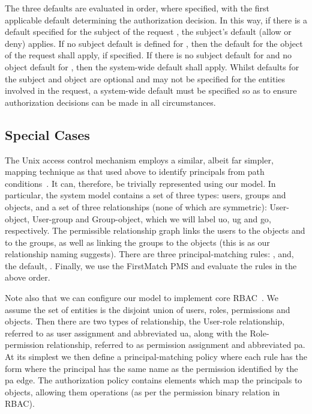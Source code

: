 \documentclass{article}
\begin{document}
The three defaults are evaluated in order, where specified, with the first applicable default determining the authorization decision. In this way, if there is a default specified for the subject  of the request , the subject's default (allow or deny) applies. If no subject default is defined for , then the default for the object  of the request shall apply, if specified. If there is no subject default for  and no object default for , then the system-wide default shall apply. Whilst defaults for the subject and object are optional and may not be specified for the entities involved in the request, a system-wide default must be specified so as to ensure authorization decisions can be made in all circumstances.

\subsection{Special Cases}\label{sec:AuthZModel:Ex}

The Unix access control mechanism employs a similar, albeit far simpler, mapping technique as that used above to identify principals from path conditions~\cite{Crampton_UnixAccessControl}. It can, therefore, be trivially represented using our model.
In particular, the system model contains a set of three types: users, groups and objects, and a set of three relationships (none of which are symmetric): \textsf{User-object}, \textsf{User-group} and \textsf{Group-object}, which we will label \textsf{uo}, \textsf{ug} and \textsf{go}, respectively.
The permissible relationship graph links the users to the objects and to the groups, as well as linking the groups to the objects (this is as our relationship naming suggests).
There are three principal-matching rules: ,  and, the default, .
Finally, we use the \textsf{FirstMatch} PMS and evaluate the rules in the above order.

Note also that we can configure our model to implement core RBAC~\cite{ANSI_RBAC}.
We assume the set of entities is the disjoint union of users, roles, permissions and objects.
Then there are two types of relationship, the \textsf{User-role} relationship, referred to as user assignment and abbreviated \textsf{ua}, along with the \textsf{Role-permission} relationship, referred to as permission assignment and abbreviated \textsf{pa}.
At its simplest we then define a principal-matching policy where each rule has the form  where the principal  has the same name as the permission identified by the \textsf{pa} edge.
The authorization policy contains elements  which map the principals to objects, allowing them operations (as per the permission binary relation in RBAC).
\end{document}
